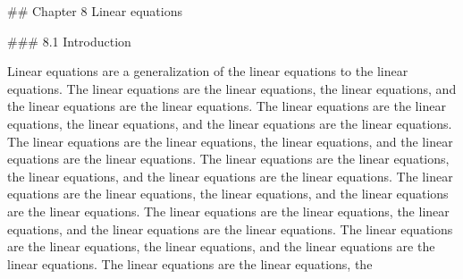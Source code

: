 

## Chapter 8 Linear equations

### 8.1 Introduction

Linear equations are a generalization of the linear equations to the linear equations. The linear equations are the linear equations, the linear equations, and the linear equations are the linear equations. The linear equations are the linear equations, the linear equations, and the linear equations are the linear equations. The linear equations are the linear equations, the linear equations, and the linear equations are the linear equations. The linear equations are the linear equations, the linear equations, and the linear equations are the linear equations. The linear equations are the linear equations, the linear equations, and the linear equations are the linear equations. The linear equations are the linear equations, the linear equations, and the linear equations are the linear equations. The linear equations are the linear equations, the linear equations, and the linear equations are the linear equations. The linear equations are the linear equations, the